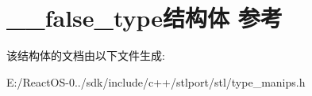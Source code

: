 \hypertarget{struct____false__type}{}\section{\+\_\+\+\_\+false\+\_\+type结构体 参考}
\label{struct____false__type}


该结构体的文档由以下文件生成\+:\begin{DoxyCompactItemize}
\item 
E\+:/\+React\+O\+S-\/0../sdk/include/c++/stlport/stl/type\+\_\+manips.\+h\end{DoxyCompactItemize}
